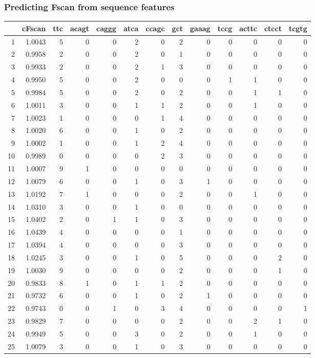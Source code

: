 \documentclass[10pt,dvipsnames,table]{beamer}
\begin{document}
\begin{frame}
\frametitle{Predicting Fscan from sequence features}
\tiny
\begin{table}[ht]
\centering
\begin{tabular}{rrrrrrrrrrrrr}
  \hline
 & cFscan & ttc & acagt & caggg & atca & ccagc & gct & gaaag & tccg & acttc & ctcct & tcgtg \\ 
  \hline
  1  & 1.0043 & 5 & 0 & 0 & 2 & 0 & 2 & 0 & 0 & 0 & 0 & 0 \\ 
  2  & 0.9958 & 2 & 0 & 0 & 2 & 0 & 1 & 0 & 0 & 0 & 0 & 0 \\ 
  3  & 0.9933 & 2 & 0 & 0 & 2 & 1 & 3 & 0 & 0 & 0 & 0 & 0 \\ 
  4  & 0.9950 & 5 & 0 & 0 & 2 & 0 & 0 & 0 & 1 & 1 & 0 & 0 \\ 
  5  & 0.9984 & 5 & 0 & 0 & 2 & 0 & 2 & 0 & 0 & 1 & 1 & 0 \\ 
  6  & 1.0011 & 3 & 0 & 0 & 1 & 1 & 2 & 0 & 0 & 1 & 0 & 0 \\ 
  7  & 1.0023 & 1 & 0 & 0 & 0 & 1 & 4 & 0 & 0 & 0 & 0 & 0 \\ 
  8  & 1.0020 & 6 & 0 & 0 & 1 & 0 & 2 & 0 & 0 & 0 & 0 & 0 \\ 
  9  & 1.0002 & 1 & 0 & 0 & 1 & 2 & 4 & 0 & 0 & 0 & 0 & 0 \\ 
  10 & 0.9989 & 0 & 0 & 0 & 0 & 2 & 3 & 0 & 0 & 0 & 0 & 0 \\ 
  11 & 1.0007 & 9 & 1 & 0 & 0 & 0 & 0 & 0 & 0 & 0 & 0 & 0 \\ 
  12 & 1.0079 & 6 & 0 & 0 & 1 & 0 & 3 & 1 & 0 & 0 & 0 & 0 \\ 
  13 & 1.0192 & 7 & 1 & 0 & 0 & 0 & 2 & 0 & 0 & 1 & 0 & 0 \\ 
  14 & 1.0310 & 3 & 0 & 0 & 1 & 0 & 0 & 0 & 0 & 0 & 0 & 0 \\ 
  15 & 1.0402 & 2 & 0 & 1 & 1 & 0 & 3 & 0 & 0 & 0 & 0 & 0 \\ 
  16 & 1.0439 & 4 & 0 & 0 & 0 & 0 & 1 & 0 & 0 & 0 & 0 & 0 \\ 
  17 & 1.0394 & 4 & 0 & 0 & 0 & 0 & 3 & 0 & 0 & 0 & 0 & 0 \\ 
  18 & 1.0245 & 3 & 0 & 0 & 1 & 0 & 5 & 0 & 0 & 0 & 2 & 0 \\ 
  19 & 1.0030 & 9 & 0 & 0 & 0 & 0 & 2 & 0 & 0 & 0 & 1 & 0 \\ 
  20 & 0.9833 & 8 & 1 & 0 & 1 & 1 & 2 & 0 & 0 & 0 & 0 & 0 \\ 
  21 & 0.9732 & 6 & 0 & 0 & 1 & 0 & 2 & 1 & 0 & 0 & 0 & 0 \\ 
  22 & 0.9743 & 0 & 0 & 1 & 0 & 3 & 4 & 0 & 0 & 0 & 0 & 1 \\ 
  23 & 0.9829 & 7 & 0 & 0 & 0 & 0 & 2 & 0 & 0 & 2 & 1 & 0 \\ 
  24 & 0.9949 & 5 & 0 & 0 & 3 & 0 & 2 & 0 & 0 & 1 & 0 & 0 \\ 
  25 & 1.0079 & 3 & 0 & 0 & 1 & 0 & 3 & 0 & 0 & 0 & 0 & 0 \\ 
   \hline
\end{tabular}
\end{table}
\end{frame}
\end{document}
